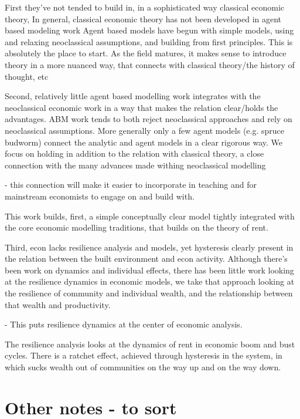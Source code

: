 First they've not tended to build in, in a sophisticated way classical economic theory,
In general, classical economic theory has not been developed in agent based modeling work
Agent based models have begun with simple models, using and relaxing neoclassical assumptions, and building from first principles. This is absolutely the place to start. As the field matures, it makes sense to introduce theory in a more nuanced way, that connects with classical theory/the history of thought, etc

Second, relatively little agent based modelling work integrates with the neoclassical economic work in a way that makes the relation clear/holds the advantages. ABM work tends to both reject neoclassical approaches and rely on neoclassical assumptions.
More generally only a few agent models (e.g. spruce budworm) connect the analytic and agent models in a clear rigorous way. We focus on holding in addition to the relation with classical theory, a close connection with the many advances made withing neoclassical modelling

- this connection will make it easier to incorporate in teaching and for mainstream economists to engage on and build with.


This work builds, first, a simple conceptually clear model tightly integrated with the core economic modelling traditions, that builds on the theory of rent.


Third, econ lacks resilience analysis and models, yet hysteresis clearly present in the relation between the built environment and econ activity. Although there's been work on dynamics and individual effects, there has been little work looking at the resilience dynamics in economic models, we take that approach looking at the resilience of community and individual wealth, and the relationship between that wealth and productivity. 

- This puts resilience dynamics at the center of economic analysis.

The resilience analysis looks at the dynamics of rent in economic boom and bust cycles.
There is a ratchet effect, achieved through hysteresis in the system, in which sucks wealth out of communities on the way up and on the way down. %


\section{Other notes - to sort}

